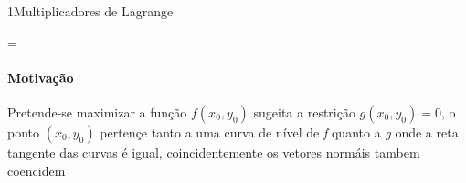 \documentclass[\mainfilename]{subfiles}
\begin{document}
\begin{sectionBox}1{Multiplicadores de Lagrange} %
    
    \begin{BM}
        = \lambda\,
    \end{BM}

    \paragraph*{Motivação} Pretende-se maximizar a função \(f(x_0,y_0)\) sugeita a restrição \(g(x_0,y_0)=0\), o ponto \((x_0,y_0)\) pertençe tanto a uma curva de nível de \textit{f} quanto a \textit{g} onde a reta tangente das curvas é igual, coincidentemente os vetores normáis tambem coencidem 
    
\end{sectionBox}
\end{document}
